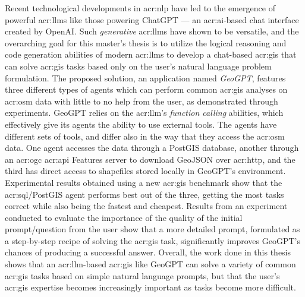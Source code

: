 Recent technological developments in \acrlong{acr:nlp} have led to the emergence of powerful \glspl{acr:llm} like those powering ChatGPT --- an \acrshort{acr:ai}-based chat interface created by OpenAI. Such \textit{generative} \glspl{acr:llm} have shown to be versatile, and the overarching goal for this master's thesis is to utilize the logical reasoning and code generation abilities of modern \glspl{acr:llm} to develop a chat-based \acrshort{acr:gis} that can solve \acrshort{acr:gis} tasks based only on the user's natural language problem formulation. The proposed solution, an application named \textit{GeoGPT}, features three different types of agents which can perform common \acrshort{acr:gis} analyses on \gls{acr:osm} data with little to no help from the user, as demonstrated through experiments. GeoGPT relies on the \acrshort{acr:llm}'s \textit{function calling} abilities, which effectively give its agents the ability to use external tools. The agents have different sets of tools, and differ also in the way that they access the \gls{acr:osm} data. One agent accesses the data through a PostGIS database, another through an \acrshort{acr:ogc} \acrshort{acr:api} Features server to download GeoJSON over \acrshort{acr:http}, and the third has direct access to shapefiles stored locally in GeoGPT's environment. Experimental results obtained using a new \acrshort{acr:gis} benchmark show that the \acrshort{acr:sql}/PostGIS agent performs best out of the three, getting the most tasks correct while also being the fastest and cheapest. Results from an experiment conducted to evaluate the importance of the quality of the initial prompt/question from the user show that a more detailed prompt, formulated as a step-by-step recipe of solving the \acrshort{acr:gis} task, significantly improves GeoGPT's chances of producing a successful answer. Overall, the work done in this thesis shows that an \acrshort{acr:llm}-based \acrshort{acr:gis} like GeoGPT can solve a variety of common \acrshort{acr:gis} tasks based on simple natural language prompts, but that the user's \acrshort{acr:gis} expertise becomes increasingly important as tasks become more difficult.


\glsresetall
